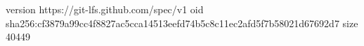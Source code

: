 version https://git-lfs.github.com/spec/v1
oid sha256:cf3879a99cc4f8827ac5cca14513eefd74b5c8c11ec2afd5f7b58021d67692d7
size 40449
